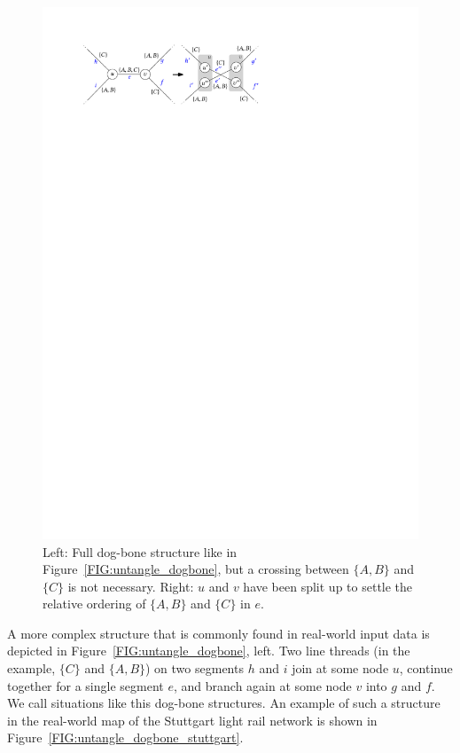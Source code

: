 \documentclass[format=acmsmall, review=false, screen=true]{acmart}
\begin{document}
\begin{figure}
\centering
  \includegraphics[width=.7\textwidth, page=2]{figures/untangling/dogbone.pdf}
  \caption{Left: Full dog-bone structure like in Figure~\ref{FIG:untangle_dogbone}, but a crossing between $\{A, B\}$ and $\{C\}$ is not necessary. Right: $u$ and $v$ have been split up to settle the relative ordering of $\{A, B\}$ and $\{C\}$ in $e$.}  
  \label{FIG:untangle_dogbone2}
\end{figure}

A more complex structure that is commonly found in real-world input data is depicted in Figure~\ref{FIG:untangle_dogbone}, left.
Two line threads (in the example, $\{C\}$ and $\{A, B\}$) on two segments $h$ and $i$ join at some node $u$, continue together for a single segment $e$, and branch again at some node $v$ into $g$ and $f$. We call situations like this dog-bone structures.
An example of such a structure in the real-world map of the Stuttgart light rail network is shown in Figure~\ref{FIG:untangle_dogbone_stuttgart}.
\end{document}
